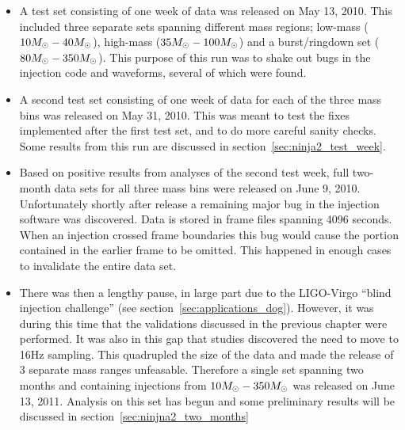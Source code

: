 \begin{itemize}
\item A test set consisting of one week of data was released on May 13, 2010.  This
included three separate sets spanning different mass regions;
low-mass ($10M_\odot - 40 M_\odot$), high-mass ($35 M_\odot - 100 M_\odot$)
and a burst/ringdown set ($80 M_\odot - 350 M_\odot$).  This purpose of
this run was to shake out bugs in the injection code and waveforms,
several of which were found.

\item A second test set consisting of one week of data for each of the
three mass bins was released on May 31, 2010.  This was meant to test
the fixes implemented after the first test set, and to do more
careful sanity checks.  Some results from this run are discussed in
section~\ref{sec:ninja2_test_week}.

\item Based on positive results from analyses of the second test week,
full two-month data sets for all three mass bins were released on June
9, 2010.  Unfortunately shortly after release a remaining major bug in
the injection software was discovered.  Data is stored in frame files
spanning 4096 seconds.  When an injection crossed frame boundaries
this bug would cause the portion contained in the earlier frame to be
omitted.  This happened in enough cases to invalidate the entire data
set.

\item There was then a lengthy pause, in large part due to the
LIGO-Virgo ``blind injection challenge'' (see
section~\ref{sec:applications_dog}).  However, it was during this time
that the validations discussed in the previous chapter were performed.
It was also in this gap that studies discovered the need to move to
16Hz sampling.   This quadrupled the size of the data and made the
release of 3 separate mass ranges unfeasable.  Therefore a single set
spanning two months and containing injections from $10 M_\odot - 350
M_\odot$ was released on June 13, 2011.  Analysis on this set has begun
and some preliminary results will be discussed in
section~\ref{sec:ninjna2_two_months}
\end{itemize}


